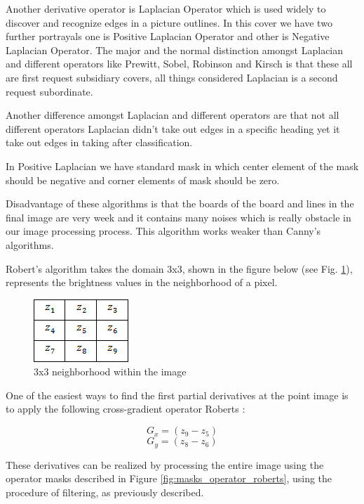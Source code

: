 Another derivative operator is Laplacian Operator which is used widely to discover and recognize edges in a picture outlines. In this cover we have two further portrayals one is Positive Laplacian Operator and other is Negative Laplacian Operator. The major and the normal distinction amongst Laplacian and different operators like Prewitt, Sobel, Robinson and Kirsch is that these all are first request subsidiary covers, all things considered Laplacian is a second request subordinate. 

Another difference amongst Laplacian and different operators are that not all different operators Laplacian didn't take out edges in a specific heading yet it take out edges in taking after classification.

In Positive Laplacian we have standard mask in which center element of the mask should be negative and corner elements of mask should be zero. \cite{Huertas}
 
Disadvantage of these algorithms is that the boards of the board and lines in the final image are very week and it contains many noises which is really obstacle in our image processing process. This algorithm works weaker than Canny’s algorithms.

Robert’s algorithm takes the domain 3x3, shown in the figure below (see Fig. \ref{fig:neighborhood_within_image}), represents the brightness values in the neighborhood of a pixel.

\begin{figure}[h]
    \centering
    \includegraphics{Figures/neighborhood_within_image}
    \caption{3x3 neighborhood within the image}
    \label{fig:neighborhood_within_image}
\end{figure}

One of the easiest ways to find the first partial derivatives at the point image is to apply the following cross-gradient operator Roberts \cite{Seif}: 

\begin{equation}
    G_x = (z_9 - z_5)
\end{equation}
\begin{equation}
    G_y = (z_8 - z_6)
\end{equation}

These derivatives can be realized by processing the entire image using the operator masks described in Figure \ref{fig:masks_operator_roberts}, using the procedure of filtering, as previously described.

